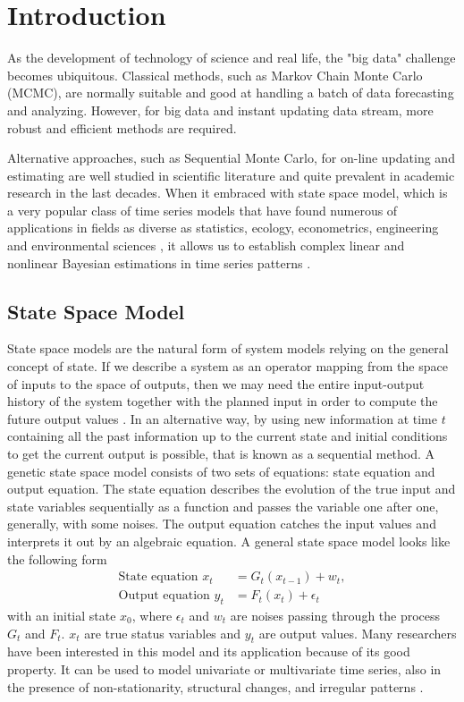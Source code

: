 

\section{Introduction}

As the development of technology of science and real life, the "big data" challenge becomes ubiquitous. Classical methods, such as Markov Chain Monte Carlo (MCMC), are normally suitable and good at handling a batch of data forecasting and analyzing. However, for big data and instant updating data stream, more robust and efficient methods are required. 


Alternative approaches, such as Sequential Monte Carlo, for on-line updating and estimating are well studied in scientific literature and quite prevalent in academic research in the last decades. When it embraced with  state space model, which is a very popular class of time series models that have found numerous of applications in fields as diverse as statistics, ecology, econometrics, engineering and environmental sciences \cite{cappe2009inference} \cite{smcmip2011} \cite{elliott1995estimation} \cite{cargnoni1997bayesian}, it allows us to establish complex linear and nonlinear Bayesian estimations in time series patterns \cite{vieira2016online}. 


\subsection*{State Space Model}

State space models are the natural form of system models relying on the general concept of state. If we describe a system as an operator mapping from the space of inputs to the space of outputs, then we may need the entire input-output history of the system together with the planned input in order to compute the future output values \cite{hangos2006analysis}. In an alternative way, by using new information at time $t$ containing all the past information up to the current state and initial conditions to get the current output is possible, that is known as a sequential method. A genetic state space model consists of two sets of equations: state equation and output equation. The state equation describes the evolution of the true input and state variables sequentially as a function and passes the variable one after one, generally, with some noises. The output equation catches the input values and interprets it out by an algebraic equation. A general state space model looks like the following form
\begin{align}\label{statemodel1}
\mbox{State equation } x_t &= G_t(x_{t-1})+w_t,\\
\label{statemodel2}
\mbox{Output equation } y_t &=F_t(x_t)+\epsilon_t
\end{align}
with an initial state $x_0$, where $\epsilon_t$ and $w_t$ are noises passing through the process $G_t$ and $F_t$. $x_t$ are true status variables and $y_t$ are output values. Many researchers have been interested in this model and its application because of its good property. It can be used to model univariate or multivariate time series, also in the presence of non-stationarity, structural changes, and irregular patterns \cite{petris2009dynamic}.

